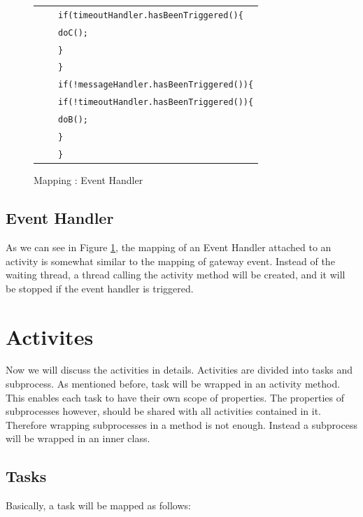 \begin{figure}[h]
\begin{tabularx}{\linewidth}{lcX}
	& & \texttt{\hspace{10pt}if(timeoutHandler.hasBeenTriggered()\{}\\
	& & \texttt{\hspace{20pt}doC();}\\
	& & \texttt{\hspace{10pt}\}}\\
	& & \texttt{\}}\\
	& & \texttt{if(!messageHandler.hasBeenTriggered())\{}\\
	& & \texttt{\hspace{10pt}if(!timeoutHandler.hasBeenTriggered())\{}\\
	& & \texttt{\hspace{20pt}doB();}\\
	& & \texttt{\hspace{10pt}\}}\\
	& & \texttt{\}}\\
\end{tabularx}
\caption{Mapping : Event Handler}%
\label{fig:mapping_eventhandler}%
\end{figure}

\subsection{Event Handler}
As we can see in Figure \ref{fig:mapping_eventhandler}, the mapping of an Event Handler attached to an activity is somewhat similar to the mapping of gateway event. Instead of the waiting thread, a thread calling the activity method will be created, and it will be stopped if the event handler is triggered.\\

\newpage
\section{Activites}
Now we will discuss the activities in details. Activities are divided into tasks and subprocess. As mentioned before, task will be wrapped in an activity method. This enables each task to have their own scope of properties. The properties of subprocesses however, should be shared with all activities contained in it. Therefore wrapping subprocesses in a method is not enough. Instead a subprocess will be wrapped in an inner class.
 
\subsection{Tasks}
Basically, a task will be mapped as follows:

